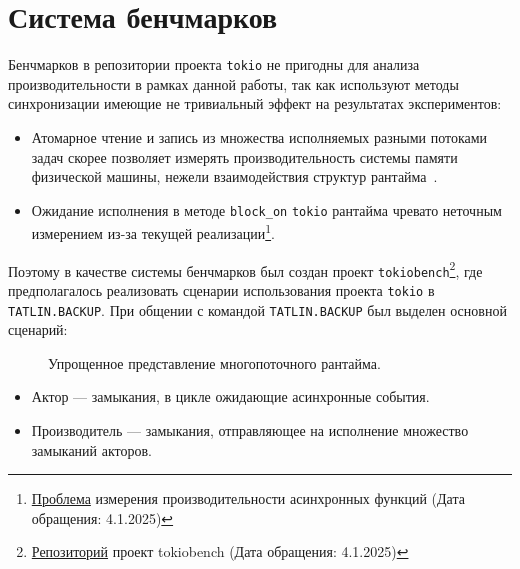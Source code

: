 
\section{Система бенчмарков}

Бенчмарков в репозитории проекта \verb|tokio| не пригодны для анализа производительности в рамках данной работы, так как используют методы синхронизации имеющие не тривиальный эффект на результатах экспериментов:

\begin{itemize}
    \item Атомарное чтение и запись из множества исполняемых разными потоками задач скорее позволяет измерять производительность системы памяти физической машины, нежели взаимодействия структур рантайма~\cite{atomicOnModerHardware}.
    \item Ожидание исполнения в методе \verb|block_on| \verb|tokio| рантайма чревато неточным измерением из-за текущей реализации\footnote{\href{https://github.com/bheisler/criterion.rs/issues/819}{Проблема} измерения производительности асинхронных функций (Дата обращения: 4.1.2025)}.
\end{itemize}

Поэтому в качестве системы бенчмарков был создан проект \verb|tokiobench|\footnote{\href{https://github.com/IgorErin/tokiobench}{Репозиторий} проект tokiobench (Дата обращения: 4.1.2025)}, где предполагалось реализовать сценарии использования проекта \verb|tokio| в \verb|TATLIN.BACKUP|. При общении с командой \verb|TATLIN.BACKUP| был выделен основной сценарий:

\begin{figure}[H]
    \begin{center}
    \end{center}

    \caption{Упрощенное представление многопоточного рантайма.}
    \label{fig:tokio:duplicated_arch}
\end{figure}

\begin{itemize}
    \item Актор --- замыкания, в цикле ожидающие асинхронные события.
    \item Производитель --- замыкания, отправляющее на исполнение множество замыканий акторов.
\end{itemize}

